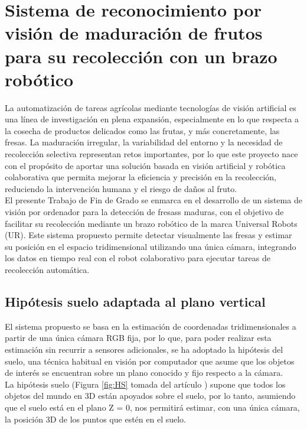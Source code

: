 \chapter[Sistema de reconocimiento y recolección]{Sistema de reconocimiento por visión de maduración de frutos\\
  para su recolección con un brazo robótico}
\label{cap:capitulo5}

La automatización de tareas agrícolas mediante tecnologías de visión artificial es una línea de investigación en plena expansión, especialmente en lo que respecta a la cosecha de productos delicados como las frutas, y más concretamente, las fresas. La maduración irregular, la variabilidad del entorno y la necesidad de recolección selectiva representan retos importantes, por lo que este proyecto nace con el propósito de aportar una solución basada en visión artificial y robótica colaborativa que permita mejorar la eficiencia y precisión en la recolección, reduciendo la intervención humana y el riesgo de daños al fruto.\\

El presente Trabajo de Fin de Grado se enmarca en el desarrollo de un sistema de visión por ordenador para la detección de fresass maduras, con el objetivo de facilitar su recolección mediante un brazo robótico de la marca Universal Robots (UR). Este sistema propuesto permite detectar visualmente las fresas y estimar su posición en el espacio tridimensional utilizando una única cámara, integrando los datos en tiempo real con el robot colaborativo para ejecutar tareas de recolección automática.

\section{Hipótesis suelo adaptada al plano vertical}
\label{sec:HS_vertical}

El sistema propuesto se basa en la estimación de coordenadas tridimensionales a partir de una única cámara RGB fija, por lo que, para poder realizar esta estimación sin recurrir a sensores adicionales, se ha adoptado la hipótesis del suelo, una técnica habitual en visión por computador que asume que los objetos de interés se encuentran sobre un plano conocido y fijo respecto a la cámara.\\

La hipótesis suelo (Figura \ref{fig:HS} tomada del artículo \cite{Vega21}) supone que todos los objetos del mundo en 3D están apoyados sobre el suelo, por lo tanto, asumiendo que el suelo está en el plano Z = 0, nos permitirá estimar, con una única cámara, la posición 3D de los puntos que estén en el suelo.

